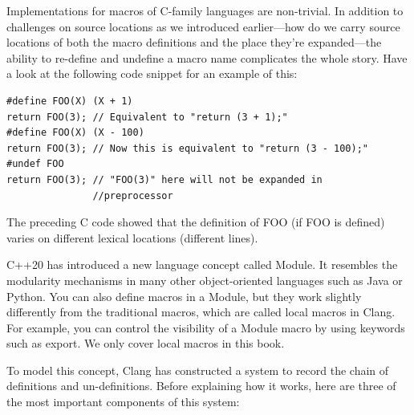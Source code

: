 
Implementations for macros of C-family languages are non-trivial. In addition to challenges on source locations as we introduced earlier—how do we carry source locations of both the macro definitions and the place they're expanded—the ability to re-define and undefine a macro name complicates the whole story. Have a look at the following code snippet for an example of this:

\begin{lstlisting}[style=styleCXX]
#define FOO(X) (X + 1)
return FOO(3); // Equivalent to "return (3 + 1);"
#define FOO(X) (X - 100)
return FOO(3); // Now this is equivalent to "return (3 - 100);"
#undef FOO
return FOO(3); // "FOO(3)" here will not be expanded in
			   //preprocessor
\end{lstlisting}

The preceding C code showed that the definition of FOO (if FOO is defined) varies on different lexical locations (different lines).

\begin{tcolorbox}[colback=blue!5!white,colframe=blue!75!black, fonttitle=\bfseries,title=Local versus Module macros]
\hspace*{0.7cm}C++20 has introduced a new language concept called Module. It resembles the modularity mechanisms in many other object-oriented languages such as Java or Python. You can also define macros in a Module, but they work slightly differently from the traditional macros, which are called local macros in Clang. For example, you can control the visibility of a Module macro by using keywords such as export. We only cover local macros in this book.
\end{tcolorbox}

To model this concept, Clang has constructed a system to record the chain of definitions and un-definitions. Before explaining how it works, here are three of the most important components of this system:

